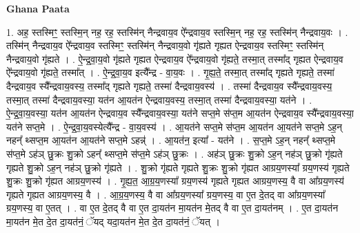 \documentclass[17pt]{extarticle}
\begin{document}
\textbf{Ghana Paata } \newline

1. अह॒ स्तस्मिꣳ॒॒ स्तस्मि॒न् नह॒ रह॒ स्तस्मि॑न् नैन्द्रवाय॒व ऐ᳚न्द्रवाय॒व स्तस्मि॒न् नह॒ रह॒ स्तस्मि॑न् नैन्द्रवाय॒वः । . तस्मि॑न् नैन्द्रवाय॒व ऐ᳚न्द्रवाय॒व स्तस्मिꣳ॒॒ स्तस्मि॑न् नैन्द्रवाय॒वो गृ॑ह्यते गृह्यत ऐन्द्रवाय॒व स्तस्मिꣳ॒॒ स्तस्मि॑न् नैन्द्रवाय॒वो गृ॑ह्यते । . ऐ॒न्द्र॒वा॒य॒वो गृ॑ह्यते गृह्यत ऐन्द्रवाय॒व ऐ᳚न्द्रवाय॒वो गृ॑ह्यते॒ तस्मा॒त् तस्मा᳚द् गृह्यत ऐन्द्रवाय॒व ऐ᳚न्द्रवाय॒वो गृ॑ह्यते॒ तस्मा᳚त् । . ऐ॒न्द्र॒वा॒य॒व इत्यै᳚न्द्र - वा॒य॒वः । . गृ॒ह्य॒ते॒ तस्मा॒त् तस्मा᳚द् गृह्यते गृह्यते॒ तस्मा॑ दैन्द्रवाय॒व स्यै᳚न्द्रवाय॒वस्य॒ तस्मा᳚द् गृह्यते गृह्यते॒ तस्मा॑ दैन्द्रवाय॒वस्य॑ । . तस्मा॑ दैन्द्रवाय॒व स्यै᳚न्द्रवाय॒वस्य॒ तस्मा॒त् तस्मा॑ दैन्द्रवाय॒वस्या॒ यत॑न आ॒यत॑न ऐन्द्रवाय॒वस्य॒ तस्मा॒त् तस्मा॑ दैन्द्रवाय॒वस्या॒ यत॑ने । . ऐ॒न्द्र॒वा॒य॒वस्या॒ यत॑न आ॒यत॑न ऐन्द्रवाय॒व स्यै᳚न्द्रवाय॒वस्या॒ यत॑ने सप्त॒मे स॑प्त॒म आ॒यत॑न ऐन्द्रवाय॒व स्यै᳚न्द्रवाय॒वस्या॒ यत॑ने सप्त॒मे । . ऐ॒न्द्र॒वा॒य॒वस्येत्यै᳚न्द्र - वा॒य॒वस्य॑ । . आ॒यत॑ने सप्त॒मे स॑प्त॒म आ॒यत॑न आ॒यत॑ने सप्त॒मे ऽह॒न् नहन्᳚ थ्सप्त॒म आ॒यत॑न आ॒यत॑ने सप्त॒मे ऽहन्न्॑ । . आ॒यत॑न॒ इत्या᳚ - यत॑ने । . स॒प्त॒मे ऽह॒न् नहन्᳚ थ्सप्त॒मे स॑प्त॒मे ऽह॑ञ् छु॒क्रः शु॒क्रो ऽहन्᳚ थ्सप्त॒मे स॑प्त॒मे ऽह॑ञ् छु॒क्रः । . अह॑ञ् छु॒क्रः शु॒क्रो ऽह॒न् नह॑ञ् छु॒क्रो गृ॑ह्यते गृह्यते शु॒क्रो ऽह॒न् नह॑ञ् छु॒क्रो गृ॑ह्यते । . शु॒क्रो गृ॑ह्यते गृह्यते शु॒क्रः शु॒क्रो गृ॑ह्यत आग्रय॒णस्या᳚ ग्रय॒णस्य॑ गृह्यते शु॒क्रः शु॒क्रो गृ॑ह्यत आग्रय॒णस्य॑ । . गृ॒ह्य॒त॒ आ॒ग्र॒य॒णस्या᳚ ग्रय॒णस्य॑ गृह्यते गृह्यत आग्रय॒णस्य॒ वै वा आ᳚ग्रय॒णस्य॑ गृह्यते गृह्यत आग्रय॒णस्य॒ वै । . आ॒ग्र॒य॒णस्य॒ वै वा आ᳚ग्रय॒णस्या᳚ ग्रय॒णस्य॒ वा ए॒त दे॒तद् वा आ᳚ग्रय॒णस्या᳚ ग्रय॒णस्य॒ वा ए॒तत् । . वा ए॒त दे॒तद् वै वा ए॒त दा॒यत॑न मा॒यत॑न मे॒तद् वै वा ए॒त दा॒यत॑नम् । . ए॒त दा॒यत॑न मा॒यत॑न मे॒त दे॒त दा॒यत॑नं॒ ॅयद् यदा॒यत॑न मे॒त दे॒त दा॒यत॑नं॒ ॅयत् । \newline
\end{document}
